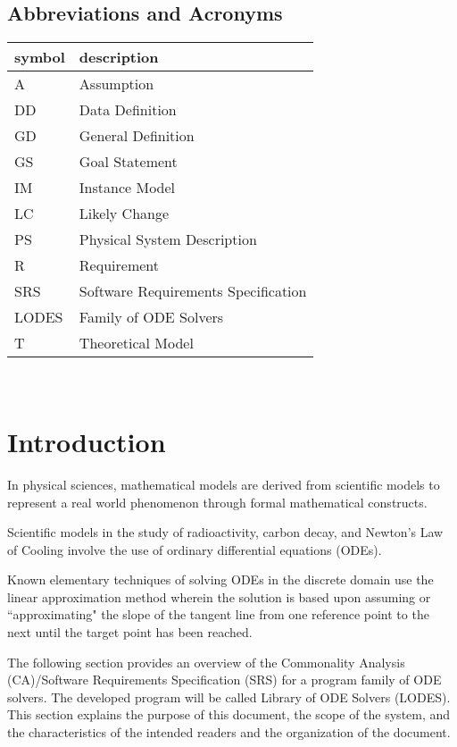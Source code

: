 \documentclass[12pt]{article}
\newcommand{\progname}{LODES} %
\newcommand{\progdesc}{Family of ODE Solvers}
\begin{document}
\subsection{Abbreviations and Acronyms}

\renewcommand{\arraystretch}{1.2}
\begin{tabular}{l l} 
  \toprule		
  \textbf{symbol} & \textbf{description}\\
  \midrule 
  A & Assumption\\
  DD & Data Definition\\
  GD & General Definition\\
  GS & Goal Statement\\
  IM & Instance Model\\
  LC & Likely Change\\
  PS & Physical System Description\\
  R & Requirement\\
  SRS & Software Requirements Specification\\
  \progname{} & \progdesc{}\\
  T & Theoretical Model\\
  \bottomrule
\end{tabular}\\


\newpage
{}

\section{Introduction}

In physical sciences, mathematical models are derived from scientific models to
represent a real world phenomenon through formal mathematical constructs.

Scientific models in the study of radioactivity, carbon decay, and Newton's Law of Cooling
involve the use of ordinary differential equations (ODEs).

Known elementary techniques of solving ODEs in the discrete domain use the linear approximation
method wherein the solution is based upon assuming or ``approximating" the slope of the tangent
line from one reference point to the next until the target point has been reached.

The following section provides an overview of the Commonality Analysis (CA)/Software Requirements
Specification (SRS) for a program family of ODE solvers. The developed program will be
called Library of ODE Solvers (\progname{}). This section explains the purpose of this
document, the scope of the system, and the characteristics of the intended readers and the
organization of the document.
\end{document}
